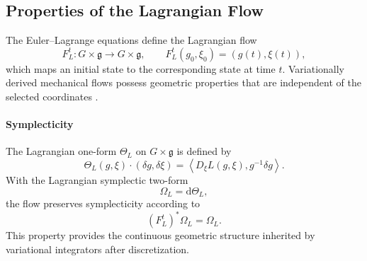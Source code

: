 \subsection{Properties of the Lagrangian Flow}
\label{sec:properties_continuous_lagrangian_flow}

The Euler--Lagrange equations define the Lagrangian flow
\begin{equation}
    F_L^t:G\times\mathfrak g\rightarrow G\times\mathfrak g,
    \qquad
    F_L^t(g_0,\xi_0)=(g(t),\xi(t)),
    \label{eq:continuous_lagrangian_flow}
\end{equation}
which maps an initial state to the corresponding state at time $t$. Variationally derived mechanical flows possess geometric properties that are independent of the selected coordinates \cite{Lee2008,Marsden2001}.

\paragraph{Symplecticity}
The Lagrangian one-form $\Theta_L$ on $G\times\mathfrak g$ is defined by
\begin{equation}
    \Theta_L(g,\xi)\cdot(\delta g,\delta\xi)
    =
    \left\langle
        D_{\xi}L(g,\xi),
        g^{-1}\delta g
    \right\rangle.
    \label{eq:continuous_lagrangian_one_form}
\end{equation}
With the Lagrangian symplectic two-form
\begin{equation}
    \Omega_L=\mathrm d\Theta_L,
    \label{eq:continuous_lagrangian_symplectic_form}
\end{equation}
the flow preserves symplecticity according to
\begin{equation}
    \left(F_L^t\right)^*\Omega_L=\Omega_L.
    \label{eq:continuous_lagrangian_flow_symplecticity}
\end{equation}
This property provides the continuous geometric structure inherited by variational integrators after discretization.

